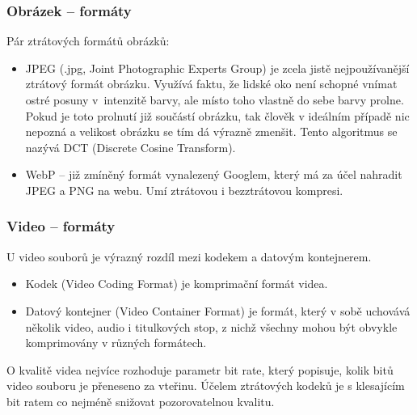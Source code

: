 \documentclass[aspectratio=169,11pt,svgnames,handout]{beamer}
\begin{document}
\begin{frame}
 \frametitle{Obrázek -- formáty}
 Pár ztrátových formátů obrázků:
 \begin{itemize}[label=\textbullet]
  \item \alert{JPEG} (.jpg, Joint Photographic Experts Group) je zcela jistě
   nejpoužívanější ztrátový formát obrázku. Využívá faktu, že lidské oko není
   schopné vnímat ostré posuny v~intenzitě barvy, ale místo toho vlastně do sebe
   barvy prolne. Pokud je toto prolnutí již součástí obrázku, tak člověk v
   ideálním případě nic nepozná a velikost obrázku se tím dá výrazně zmenšit.
   Tento algoritmus  se nazývá DCT (Discrete Cosine Transform).
  \pause
  \item \alert{WebP} -- již zmíněný formát vynalezený Googlem, který má za účel
   nahradit JPEG a PNG na webu. Umí ztrátovou i bezztrátovou kompresi.
\end{itemize}
\end{frame}

\begin{frame}
 \frametitle{Video -- formáty}
 U video souborů je výrazný rozdíl mezi \alert{kodekem} a \alert{datovým
 kontejnerem}.
 \pause
 \begin{itemize}[label=\textbullet]
  \item \alert{Kodek} (Video Coding Format) je komprimační formát videa.
  \pause
  \item \alert{Datový kontejner} (Video Container Format) je formát, který v
   sobě uchovává několik video, audio i titulkových stop, z nichž všechny mohou
   být obvykle komprimovány v různých formátech.
 \end{itemize}
 \pause
 O kvalitě videa nejvíce rozhoduje parametr \alert{bit rate}, který popisuje,
 kolik bitů video souboru je přeneseno za vteřinu. Účelem ztrátových kodeků je s
 klesajícím bit ratem co nejméně snižovat pozorovatelnou kvalitu.
\end{frame}
\end{document}
